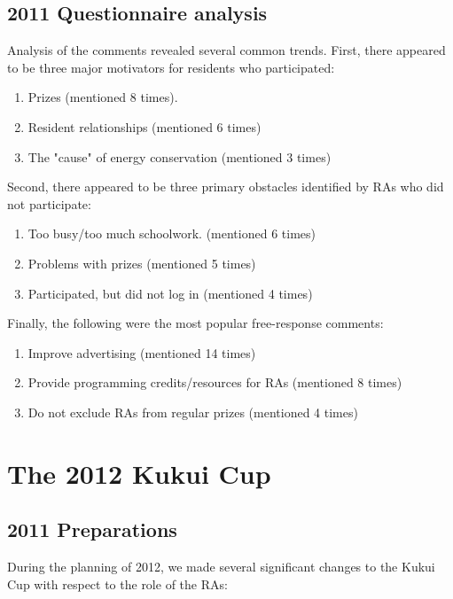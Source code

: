 \documentclass[]{article}
\begin{document}
\subsection{2011 Questionnaire analysis}

Analysis of the comments revealed several common trends.  First, there appeared to be three major motivators for residents who participated:

\begin{enumerate}[noitemsep]
\item Prizes (mentioned 8 times).
\item Resident relationships (mentioned 6 times)
\item The "cause" of energy conservation (mentioned 3 times)
\end{enumerate}

Second, there appeared to be three primary obstacles identified by RAs who did not participate:

\begin{enumerate}[noitemsep]
\item Too busy/too much schoolwork. (mentioned 6 times)
\item Problems with prizes (mentioned 5 times)
\item Participated, but did not log in (mentioned 4 times)
\end{enumerate}

Finally, the following were the most popular free-response comments:

\begin{enumerate}[noitemsep]
\item Improve advertising (mentioned 14 times)
\item Provide programming credits/resources for RAs (mentioned 8 times)
\item Do not exclude RAs from regular prizes (mentioned 4 times)
\end{enumerate}

\section{The 2012 Kukui Cup}

\subsection{2011 Preparations}

During the planning of 2012, we made several significant changes to the Kukui Cup with
respect to the role of the RAs:
\end{document}
